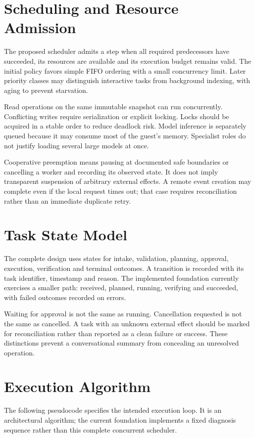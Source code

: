 \section{Scheduling and Resource Admission}
The proposed scheduler admits a step when all required predecessors have succeeded, its resources are available and its execution budget remains valid. The initial policy favors simple FIFO ordering with a small concurrency limit. Later priority classes may distinguish interactive tasks from background indexing, with aging to prevent starvation.

Read operations on the same immutable snapshot can run concurrently. Conflicting writes require serialization or explicit locking. Locks should be acquired in a stable order to reduce deadlock risk. Model inference is separately queued because it may consume most of the guest's memory. Specialist roles do not justify loading several large models at once.

Cooperative preemption means pausing at documented safe boundaries or cancelling a worker and recording its observed state. It does not imply transparent suspension of arbitrary external effects. A remote event creation may complete even if the local request times out; that case requires reconciliation rather than an immediate duplicate retry.

\section{Task State Model}
The complete design uses states for intake, validation, planning, approval, execution, verification and terminal outcomes. A transition is recorded with its task identifier, timestamp and reason. The implemented foundation currently exercises a smaller path: received, planned, running, verifying and succeeded, with failed outcomes recorded on errors.


Waiting for approval is not the same as running. Cancellation requested is not the same as cancelled. A task with an unknown external effect should be marked for reconciliation rather than reported as a clean failure or success. These distinctions prevent a conversational summary from concealing an unresolved operation.

\section{Execution Algorithm}
The following pseudocode specifies the intended execution loop. It is an architectural algorithm; the current foundation implements a fixed diagnosis sequence rather than this complete concurrent scheduler.

